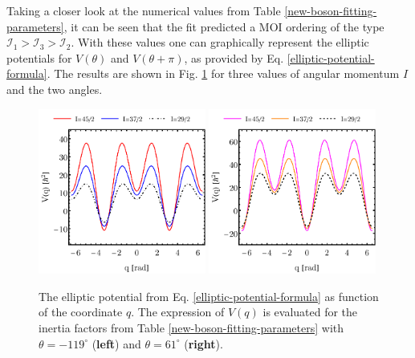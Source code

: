 Taking a closer look at the numerical values from Table \ref{new-boson-fitting-parameters}, it can be seen that the fit predicted a MOI ordering of the type $\mathcal{I}_1>\mathcal{I}_3>\mathcal{I}_2$. With these values one can graphically represent the elliptic potentials for $V(\theta)$ and $V(\theta+\pi)$, as provided by Eq. \ref{elliptic-potential-formula}. The results are shown in Fig. \ref{elliptic-potential-theta} for three values of angular momentum $I$ and the two angles.
\begin{figure}[b] %
    \centering
    \includegraphics[width=0.49\textwidth]{Chapters/Figures/potential-fit-theta.pdf}
    \includegraphics[width=0.49\textwidth]{Chapters/Figures/potential-fit-theta-pi.pdf}
    \caption{The elliptic potential from Eq. \ref{elliptic-potential-formula} as function of the coordinate $q$. The expression of $V(q)$ is evaluated for the inertia factors from Table \ref{new-boson-fitting-parameters} with $\theta=-119^\circ$ (\textbf{left}) and $\theta=61^\circ$ (\textbf{right}).}
    \label{elliptic-potential-theta}
\end{figure}

